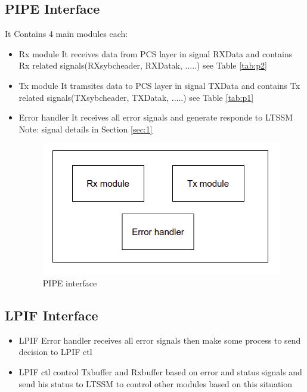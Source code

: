 \subsection{PIPE Interface}
 It Contains 4 main modules each:
 \begin{itemize}
     \item Rx module \newline
     It receives data from PCS layer in signal RXData and contains Rx related signals(RXsybcheader, RXDatak, .....) see Table \ref{tab:p2}
     \item Tx module \newline
     It tramsites data to PCS layer in signal TXData and contains Tx related signals(TXsybcheader, TXDatak, .....) see Table \ref{tab:p1}
     \item Error handler \newline
     It receives all error signals and generate responde to LTSSM 
     Note: signal details in Section \ref{sec:1}
     
  \begin{figure}[H]
  \centering
  \includegraphics{images/pipe_interface.png}
  \caption{PIPE interface}
  
  \label{fig:pipe}

  
\end{figure}


 \end{itemize}
 
  \subsection{LPIF Interface}
  
  \begin{itemize}
      \item   LPIF Error handler receives all error signals then make some process to send decision to  LPIF ctl 
        \item LPIF ctl control  Txbuffer and Rxbuffer based on error and status signals and send his status to LTSSM to control other modules based on this situation 
  \end{itemize}

